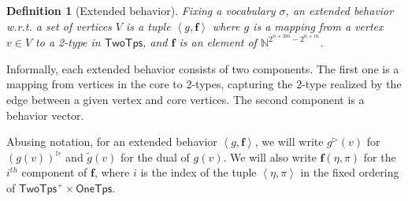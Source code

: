 \documentclass[10pt,a4paper]{article}
\newtheorem{definition}[theorem]{Definition}
\theoremstyle{definition}
\theoremstyle{remark}
\newcommand{\bbN}{\mathbb{N}}
\newcommand{\bff}{\mathbf{f}}
\newcommand{\vocab}{\sigma}
\newcommand{\twotypes}{\mathsf{TwoTps}}
\newcommand{\Onetypes}{\mathsf{OneTps}}
\newcommand{\tuple}[1]       {\left\langle #1 \right\rangle}
\newcommand{\dual}[1] {\widetilde{ #1 }}
\newcommand{\trif} {\triangleright}
\begin{document}
\begin{definition}[Extended behavior]
    Fixing a vocabulary $\vocab$, an \emph{extended behavior} w.r.t. 
    a set of vertices $V$ is a tuple $\tuple{g, \bff}$ where
    $g$ is a mapping from a vertex $v \in V$ to a 2-type in $\twotypes$, 
    and
    $\bff$ is an element of $\bbN^{2^{n+3m}-2^{n+m}}$.

\end{definition}

Informally, each extended behavior consists of two components.
The first one is a mapping from vertices in the core to 2-types,
capturing the 2-type realized by the edge between a given vertex and core vertices.
The second component is a behavior vector.

Abusing notation, for an extended behavior $\tuple{g, \bff}$,
we will write $g^\trif(v)$ for ${(g(v))}^\trif$ and
$\dual{g}(v)$ for the dual of $g(v)$.
We will also write
$\bff(\eta, \pi)$ for the $i^{th}$ component of $\bff$,
where $i$ is the index of the tuple $\tuple{\eta, \pi}$ in the fixed ordering of $\twotypes^+ \times \Onetypes$.
\end{document}
